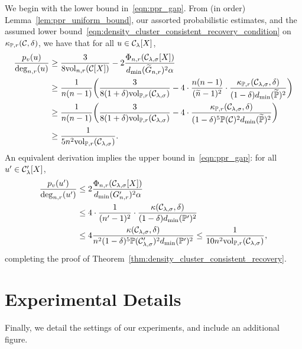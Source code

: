 We begin with the lower bound in~\eqref{eqn:ppr_gap}. From (in order) Lemma~\ref{lem:ppr_uniform_bound}, our assorted probabilistic estimates, and the assumed lower bound~\eqref{eqn:density_cluster_consistent_recovery_condition} on $\kappa_{\mathbb{P},r}(\mathcal{C},\delta)$, we have that for all $u \in \mathcal{C}_{\lambda}[X]$,
\begin{align*}
\frac{p_v(u)}{\deg_{n,r}(u)} & \geq \frac{3}{8\mathrm{vol}_{n,r}(\mathcal{C}[X])} - 2\frac{\Phi_{n,r}(\mathcal{C}_{\lambda,\sigma}[X])}{d_{\min}(\widetilde{G}_{n,r})^2 \alpha} \\
& \geq \frac{1}{n(n - 1)}\biggl(\frac{3}{8(1 + \delta)\mathrm{vol}_{\mathbb{P},r}(\mathcal{C}_{\lambda,\sigma})} - 4 \cdot \frac{n(n - 1)}{(\widetilde{n} - 1)^2} \cdot \frac{\kappa_{\mathbb{P},r}(\mathcal{C}_{\lambda,\sigma},\delta)}{(1 - \delta) d_{\min}(\widetilde{\mathbb{P}})^2}\biggr) \\
& \geq \frac{1}{n(n - 1)}\biggl(\frac{3}{8(1 + \delta)\mathrm{vol}_{\mathbb{P},r}(\mathcal{C}_{\lambda,\sigma})} - 4 \cdot \frac{\kappa_{\mathbb{P},r}(\mathcal{C}_{\lambda,\sigma},\delta)}{(1 - \delta)^5 \mathbb{P}(\mathcal{C})^2 d_{\min}(\widetilde{\mathbb{P}})^2}\biggr) \\
& \geq \frac{1}{5 n^2\mathrm{vol}_{\mathbb{P},r}(\mathcal{C}_{\lambda,\sigma})}.
\end{align*}
An equivalent derivation implies the upper bound in~\eqref{eqn:ppr_gap}: for all $u' \in \mathcal{C}_{\lambda}'[X]$,
\begin{align*}
\frac{p_v(u')}{\deg_{n,r}(u')} & \leq 2 \frac{\Phi_{n,r}(\mathcal{C}_{\lambda,\sigma}[X])}{d_{\min}(G_{n,r}')^2 \alpha} \\
& \leq 4 \cdot \frac{1}{(n' - 1)^2} \cdot \frac{ \kappa(\mathcal{C}_{\lambda,\sigma},\delta)}{(1 - \delta) d_{\min}(\mathbb{P}')^2} \\
& \leq 4\frac{ \kappa(\mathcal{C}_{\lambda,\sigma},\delta)}{n^2 (1 - \delta)^5 \mathbb{P}(\mathcal{C}_{\lambda,\sigma}')^2 d_{\min}(\mathbb{P}')^2} \leq \frac{1}{10 n^2\mathrm{vol}_{\mathbb{P},r}(\mathcal{C}_{\lambda,\sigma})},
\end{align*}
completing the proof of Theorem~\ref{thm:density_cluster_consistent_recovery}.

\section{Experimental Details}
\label{apdx:experimental_details}
Finally, we detail the settings of our experiments, and include an additional figure.

